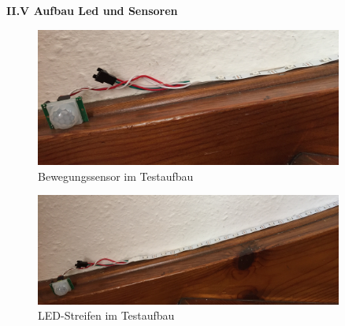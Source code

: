 \textbf{II.V Aufbau Led und Sensoren}\\
\begin{figure}[h]
	\begin{minipage}{0.9\textwidth}
		\centering
		\includegraphics[width=0.9\textwidth]{./data/praxis4.jpg}
		\caption{Bewegungssensor im Testaufbau}
	\end{minipage}
\end{figure}
\begin{figure}[h]
	\begin{minipage}{0.9\textwidth}
		\centering
		\includegraphics[width=0.9\textwidth]{./data/praxis5.jpg}
		\caption{LED-Streifen im Testaufbau}
	\end{minipage}
\end{figure}